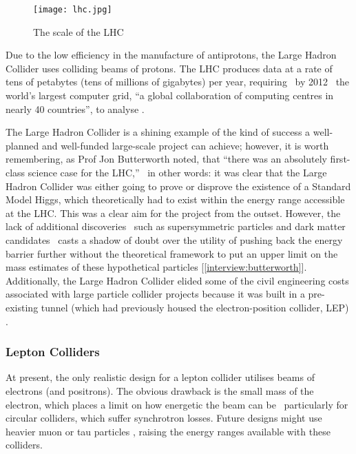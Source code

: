 \begin{figure}[!htb]
\centering
\texttt{[image: lhc.jpg]}
\caption{The scale of the LHC \cite{ATLAS:Gallery:Online}}
\end{figure}

Due to the low efficiency in the manufacture of antiprotons, the Large Hadron Collider uses colliding beams of protons. The LHC produces data at a rate of tens of petabytes (tens of millions of gigabytes) per year, requiring \textemdash \, by 2012 \textemdash \, the world's largest computer grid, ``a global collaboration of computing centres in nearly 40 countries'', to analyse \cite{LHC:ComputingGrid:Online}.

The Large Hadron Collider is a shining example of the kind of success a well-planned and well-funded large-scale project can achieve; however, it is worth remembering, as Prof Jon Butterworth noted, that ``there was an absolutely first-class science case for the LHC,'' \textemdash \, in other words: it was clear that the Large Hadron Collider was either going to prove or disprove the existence of a Standard Model Higgs, which theoretically had to exist within the energy range accessible at the LHC. This was a clear aim for the project from the outset. However, the lack of additional discoveries \textemdash \, such as supersymmetric particles and dark matter candidates \textemdash \, casts a shadow of doubt over the utility of pushing back the energy barrier further without the theoretical framework to put an upper limit on the mass estimates of these hypothetical particles [\ref{interview:butterworth}]. Additionally, the Large Hadron Collider elided some of the civil engineering costs associated with large particle collider projects because it was built in a pre-existing tunnel (which had previously housed the electron-position collider, LEP) \cite{CERN:LEP:Online}.

\subsubsection{Lepton Colliders}
At present, the only realistic design for a lepton collider utilises beams of electrons (and positrons). The obvious drawback is the small mass of the electron, which places a limit on how energetic the beam can be \textemdash \, particularly for circular colliders, which suffer synchrotron losses. Future designs might use heavier muon or tau particles \cite{Fermi:Muon:Online}, raising the energy ranges available with these colliders.

